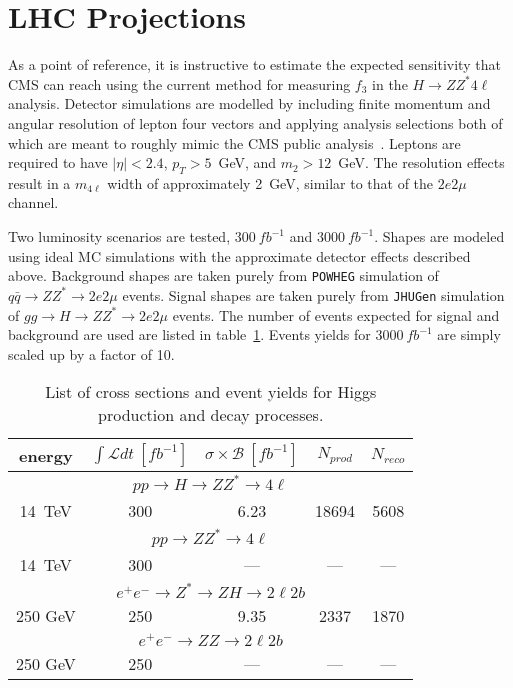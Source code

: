 \section{LHC Projections}

As a point of reference, it is instructive to estimate the
expected sensitivity that CMS can reach using the current method
for measuring $f_3$ in the $H\to ZZ^*4\ell$ analysis.  Detector
simulations are modelled by 
including finite momentum and angular resolution of lepton
four vectors and applying analysis selections both of which are
meant to roughly mimic the CMS public analysis~\cite{MORIOND PAS}.  Leptons are
required to have $|\eta|<2.4$, $p_T>5$~GeV, and $m_2>12$~GeV.
The resolution effects result in a $m_{4\ell}$ width of
approximately 2~GeV, similar to that of the $2e2\mu$ channel.  

Two luminosity scenarios are tested, $300~fb^{-1}$ and 
$3000~fb^{-1}$.  Shapes are modeled using ideal MC simulations
with the approximate detector effects described above.
Background shapes are taken purely from \verb+POWHEG+ simulation
of $q\bar{q}\to ZZ^*\to 2e2\mu$ events.  Signal shapes are
taken purely from \verb+JHUGen+ simulation of 
$gg\to H\to ZZ^*\to 2e2\mu$ events.  
The number of events expected for signal and background are 
used are listed in table~\ref{table:FutureMeasEventYields}.
Events yields for $3000~fb^{-1}$ are simply scaled up by 
a factor of 10. 

\begin{table}
\begin{center}
\begin{tabular}{ccccc}
\hline 
\hline
energy & $\int \mathscr{L}dt~[fb^{-1}]$ & 
$\sigma\times\mathscr{B}~[fb^{-1}]$ & $N_{prod}$ & $N_{reco}$ \\ 
\hline
\hline
\multicolumn{5}{c}{$pp\to H \to ZZ^* \to 4\ell$}  \\
\hline
14~TeV & 300  &  6.23 & 18694 & 5608 \\
\hline
\multicolumn{5}{c}{$pp\to ZZ^* \to 4\ell$}  \\
\hline
14~TeV & 300 &  --- & --- & --- \\
\hline
\multicolumn{5}{c}{$e^+e^-\to Z^* \to ZH \to 2\ell 2b$} \\
\hline
250 GeV & 250 & 9.35 & 2337 & 1870 \\
\hline
\multicolumn{5}{c}{$e^+e^-\to ZZ \to 2\ell 2b$} \\
\hline
250 GeV & 250 & --- & --- & --- \\
\hline
\hline
\end{tabular}
\end{center}
\label{table:FutureMeasEventYields}
\caption{List of cross sections and event yields for Higgs
production and decay processes.}
\end{table}

